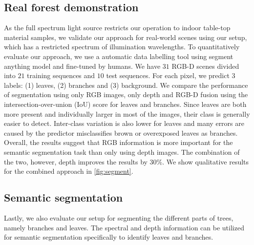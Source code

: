 \subsection{Real forest demonstration}
\label{sec:realforest}
As the full spectrum light source restricts our operation to indoor table-top material samples, we validate our approach for real-world scenes using our \cite{ESL} setup, which has a restricted spectrum of illumination wavelengths.
To quantitatively evaluate our approach, we use a automatic data labelling tool using segment anything model and fine-tuned by humans.
We have $31$ RGB-D scenes divided into $21$ training sequences and $10$ test sequences.
For each pixel, we predict $3$ labels: (1)  leaves, (2) branches and (3) background.
We compare the performance of segmentation using only RGB images, only depth and RGB-D fusion using the intersection-over-union (IoU) score for leaves and branches.
Since leaves are both more present and individually larger in most of the images, their class is generally easier to detect. Inter-class variation is also lower for leaves and many errors are caused by the predictor misclassifies brown or overexposed
leaves as branches. 
Overall, the results suggest that RGB information is more important for the semantic segmentation task than only using depth images. 
The combination of the two, however, depth improves the results by 30\%.
We show qualitative results for the combined approach in \Fig \ref{fig:segment}.


\subsection{Semantic segmentation}
Lastly, we also evaluate our setup for segmenting the different parts of trees, namely branches and leaves.
The spectral and depth information can be utilized for semantic segmentation specifically to identify leaves and branches.
\begin{figure*}
    \centering
    \caption{Segmentation results}
    \label{fig:segment}
\end{figure*}
